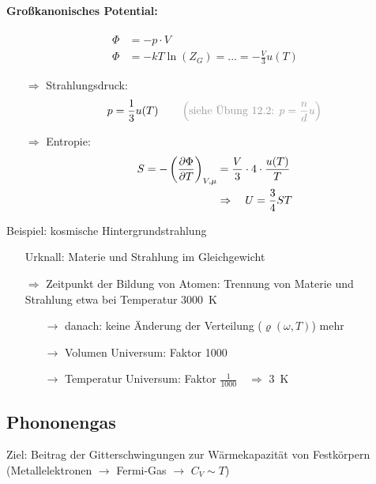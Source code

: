 \paragraph{Großkanonisches Potential:}
\begin{align}
    \Phi &= - p \cdot V\\
    \Phi &= -kT \ln(Z_G) = ... = -\frac{V}{3} u(T)
\end{align}
\begin{itemize}
    \item[$\Rightarrow$] Strahlungsdruck:
    \begin{equation}
        p = \frac{1}{3} u(T) \qquad \color{black!40}\left(\text{siehe Übung 12.2: } p = \frac{n}{d}u\right)
    \end{equation}
    \item[$\Rightarrow$] Entropie:
    \begin{align}
        S = - \left(\pdv{\Phi}{T}\right)_{V,\mu} &= \frac{V}{3} \cdot 4 \cdot \frac{u(T)}{T}\\
        &\Rightarrow \quad U = \frac{3}{4} ST
    \end{align}
\end{itemize}

\begin{beispiel}{Beispiel: kosmische Hintergrundstrahlung}
    \begin{itemize}
        \item[] Urknall: Materie und Strahlung im Gleichgewicht
        \item[] $\Rightarrow$ Zeitpunkt der Bildung von Atomen: Trennung von Materie und Strahlung etwa bei Temperatur \SI{3000}{\K}
        \begin{itemize}
            \item[$\rightarrow$] danach: keine Änderung der Verteilung ($\varrho(\omega,T)$) mehr
            \item[$\rightarrow$] Volumen Universum: Faktor 1000
            \item[$\rightarrow$] Temperatur Universum: Faktor $\frac{1}{1000}\quad \Rightarrow$ \SI{3}{\K}
        \end{itemize}
    \end{itemize}
\end{beispiel}



\subsection{Phononengas}
Ziel: Beitrag der Gitterschwingungen zur Wärmekapazität von Festkörpern (Metallelektronen $\rightarrow$ Fermi-Gas $\rightarrow$ $C_V\sim T$)\\
\newline
